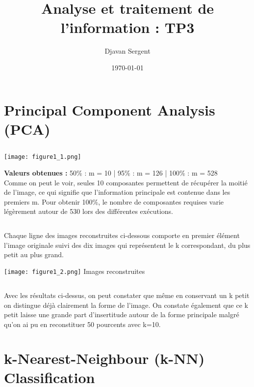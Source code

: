 \documentclass{article}
\title{Analyse et traitement de l'information : TP3}
\author{Djavan Sergent}
\date{\today}
\begin{document}
	\maketitle
	\section{Principal Component Analysis (PCA)}
		\subsection{}
		\begin{center}
			\texttt{[image: figure1\_1.png]}
		\end{center}

		\textbf{Valeurs obtenues :} 50\%  : m = 10  | 95\%  : m = 126 | 100\% : m = 528 \\
		
		Comme on peut le voir, seules 10 composantes permettent de récupérer la moitié de l'image, ce qui signifie que l'information principale est contenue dans les premiers m. Pour obtenir 100\%, le nombre de composantes requises varie légèrement autour de 530 lors des différentes exécutions.
		
		\subsection{}
		Chaque ligne des images reconstruites ci-dessous comporte en premier élément l'image originale suivi des dix images qui représentent le k correspondant, du plus petit au plus grand.
			\begin{center}
				\texttt{[image: figure1\_2.png]}
				Images reconstruites
			\end{center}
	
		\subsection{}
		Avec les résultats ci-dessus, on peut constater que même en conservant un k petit on distingue déjà clairement la forme de l'image. On constate également que ce k petit laisse une grande part d'insertitude autour de la forme principale malgré qu'on ai pu en reconstituer 50 pourcents avec k=10.
	
	\section{k-Nearest-Neighbour (k-NN) Classification}
	
\end{document}
